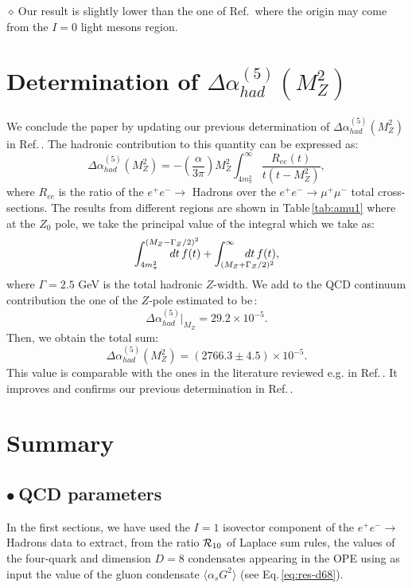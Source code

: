 \documentclass[review]{elsarticle}
\def\beq{\begin{equation}}
\def\eeq{\end{equation}}
\def\ga{\left(}
\def\dr{\right)}
\def\la{\langle}
\def\ra{\rangle}
\def\b{$\bullet~$}
\def\d{$\diamond~$}
\begin{document}
\d Our result is slightly lower than the one of Ref.\,\cite{NOMURA} where the origin may come from the $I=0$ light mesons region. 

\section{Determination of $ \Delta \alpha_{had}^{(5)} (M_Z^2)$}
We conclude the paper by updating our previous determination of $\Delta \alpha_{had}^{(5)} (M_Z^2)$ in Ref.\,\cite{SNalfa}. The hadronic contribution to this quantity can be expressed as:
\beq
\Delta \alpha_{had}^{(5)} (M_Z^2)=-\ga \frac{\alpha}{3\pi}\dr M^2_Z\int_{4m_\pi^2}^\infty \frac{R_{ee}(t)}{t(t-M_Z^2)},
\eeq
where $R_{ee}$ is the ratio of the $e^+e^-\to$ Hadrons over the  $e^+e^-\to \mu^+\mu^-$ total cross-sections. 
The results from different regions are shown in Table\,\ref{tab:amu1} where at the  $Z_0$ pole, we take the principal value of the integral which we take as:
\beq
\int_{4m_\pi^2}^{(M_Z- \Gamma_Z/2)^2}\hspace*{-1cm} dt\,f(t)+\int_{(M_Z+ \Gamma_Z/2)^2}^{\infty}\hspace*{-1cm}dt\,f(t),
\eeq
where $\Gamma =2.5$ GeV is the total hadronic $Z$-width. We add to the QCD continuum contribution the one of the $Z$-pole estimated to be\,\cite{YND17}:
\beq
\Delta \alpha_{had}^{(5)}\vert_{M_Z}= 29.2\times 10^{-5}.
\eeq
Then, we obtain the total sum:
\beq
\Delta \alpha_{had}^{(5)} (M_Z^2)= (2766.3\pm 4.5)\times 10^{-5}. 
\eeq 
This value is comparable with the ones in the literature reviewed e.g. in Ref.\,\cite{JEGER}.  It improves and confirms our previous determination in Ref.\,\cite{SNalfa}. 
\section{Summary}
\subsection*{\b QCD parameters}

In the first sections, we have used the $I=1$ isovector component of the $e^+e^-\to$ Hadrons data to extract, from the ratio ${\cal R}_{10}$ of Laplace sum rules, the values of the four-quark and dimension $D=8$ condensates appearing in the OPE using as input the value of the gluon condensate $\la\alpha_s G^2\ra$ (see Eq.\,\ref{eq:res-d68}). 
\end{document}
